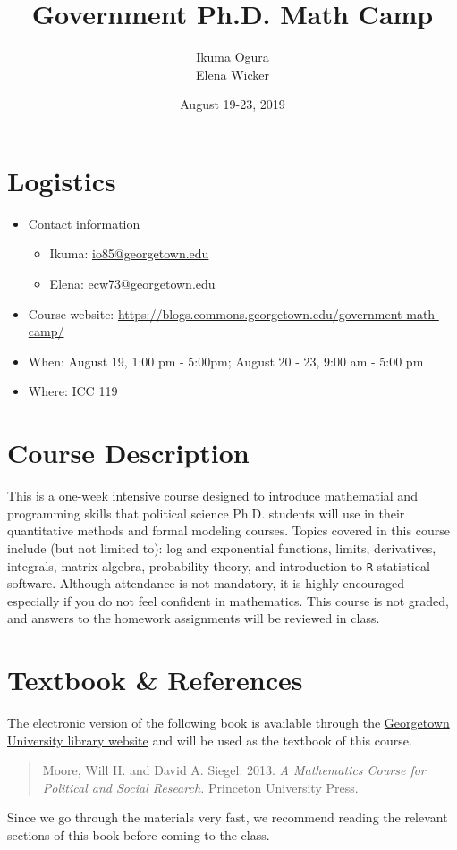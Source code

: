 \documentclass[pdflatex, letterpaper, 12pt]{scrartcl}
\title{Government Ph.D. Math Camp}
\author{Ikuma Ogura \\ Elena Wicker}
\date{August 19-23, 2019}
\begin{document}
\maketitle

\section*{Logistics}

\begin{itemize}
\item Contact information
 \begin{itemize}
 \item Ikuma: \href{mailto:io85@georgetown.edu}{io85@georgetown.edu}
 \item Elena: \href{mailto:ecw73@georgetown.edu}{ecw73@georgetown.edu}
 \end{itemize}
\item Course website: \href{https://blogs.commons.georgetown.edu/government-math-camp/}{https://blogs.commons.georgetown.edu/government-math-camp/}
\item When: August 19, 1:00 pm - 5:00pm; August 20 - 23, 9:00 am - 5:00 pm
\item Where: ICC 119
\end{itemize}

\section*{Course Description}

This is a one-week intensive course designed to introduce mathematial and programming skills that political science Ph.D. students will use in their quantitative methods and formal modeling courses. Topics covered in this course include (but not limited to): log and exponential functions, limits, derivatives, integrals, matrix algebra, probability theory, and introduction to \texttt{R} statistical software. Although attendance is not mandatory, it is highly encouraged especially if you do not feel confident in mathematics. This course is not graded, and answers to the homework assignments will be reviewed in class.   

\section*{Textbook \& References}

The electronic version of the following book is available through the \href{https://www.library.georgetown.edu/}{Georgetown University library website} and will be used as the textbook of this course.
\begin{quote}
Moore, Will H. and David A. Siegel. 2013. \emph{A Mathematics Course for Political and Social Research.} Princeton University Press.
\end{quote}
Since we go through the materials very fast, we recommend reading the relevant sections of this book before coming to the class.
\end{document}
